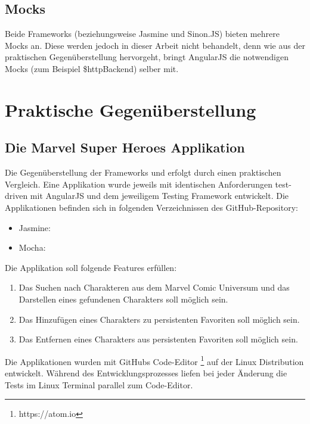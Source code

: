 \subsection{Mocks}
Beide Frameworks (beziehungsweise Jasmine und Sinon.JS) bieten mehrere Mocks an. Diese werden jedoch in dieser Arbeit nicht behandelt, denn wie aus der praktischen Gegenüberstellung hervorgeht, bringt AngularJS die notwendigen Mocks (zum Beispiel \$httpBackend) selber mit.

\newpage
\section{Praktische Gegenüberstellung}

\subsection{Die Marvel Super Heroes Applikation}
Die Gegenüberstellung der Frameworks  und  erfolgt durch einen praktischen Vergleich. Eine Applikation wurde jeweils mit identischen Anforderungen test-driven mit AngularJS und dem jeweiligem Testing Framework entwickelt.
Die Applikationen befinden sich in folgenden Verzeichnissen des GitHub-Repository:
\begin{itemize}
  \item Jasmine: 
  \item Mocha: 
\end{itemize}

Die Applikation  soll folgende Features erfüllen:

\begin{enumerate}
 \item Das Suchen nach Charakteren aus dem Marvel Comic Universum und das Darstellen eines gefundenen Charakters soll möglich sein.
 \item Das Hinzufügen eines Charakters zu persistenten Favoriten soll möglich sein.
 \item Das Entfernen eines Charakters aus persistenten Favoriten soll möglich sein.
\end{enumerate}

Die Applikationen wurden mit GitHubs Code-Editor \footnote{https://atom.io} auf der Linux Distribution  entwickelt. Während des Entwicklungsprozesses liefen bei jeder Änderung die Tests im Linux Terminal parallel zum Code-Editor.

